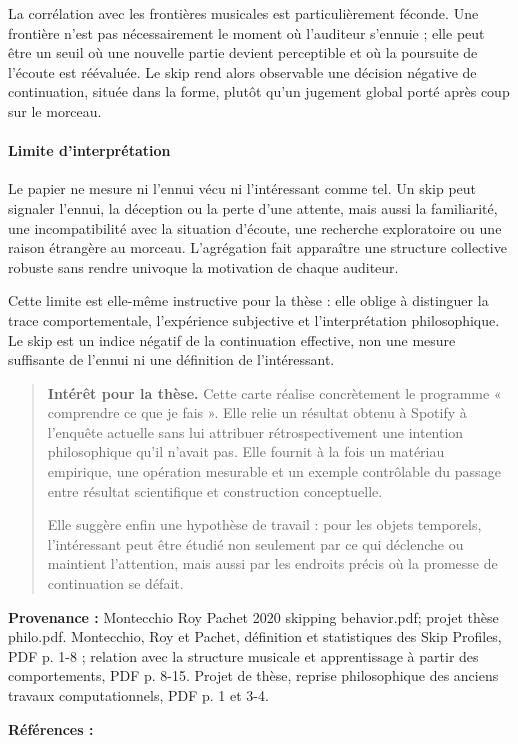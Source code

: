 \documentclass[10pt,a4paper]{article}
\begin{document}
La corrélation avec les frontières musicales est particulièrement féconde. Une frontière n'est pas nécessairement le moment où l'auditeur s'ennuie ; elle peut être un seuil où une nouvelle partie devient perceptible et où la poursuite de l'écoute est réévaluée. Le skip rend alors observable une décision négative de continuation, située dans la forme, plutôt qu'un jugement global porté après coup sur le morceau.

\paragraph{Limite d'interprétation}
Le papier ne mesure ni l'ennui vécu ni l'intéressant comme tel. Un skip peut signaler l'ennui, la déception ou la perte d'une attente, mais aussi la familiarité, une incompatibilité avec la situation d'écoute, une recherche exploratoire ou une raison étrangère au morceau. L'agrégation fait apparaître une structure collective robuste sans rendre univoque la motivation de chaque auditeur.

Cette limite est elle-même instructive pour la thèse : elle oblige à distinguer la trace comportementale, l'expérience subjective et l'interprétation philosophique. Le skip est un indice négatif de la continuation effective, non une mesure suffisante de l'ennui ni une définition de l'intéressant.

\begin{quote}
\textbf{Intérêt pour la thèse.} Cette carte réalise concrètement le programme « comprendre ce que je fais ». Elle relie un résultat obtenu à Spotify à l'enquête actuelle sans lui attribuer rétrospectivement une intention philosophique qu'il n'avait pas. Elle fournit à la fois un matériau empirique, une opération mesurable et un exemple contrôlable du passage entre résultat scientifique et construction conceptuelle.

Elle suggère enfin une hypothèse de travail : pour les objets temporels, l'intéressant peut être étudié non seulement par ce qui déclenche ou maintient l'attention, mais aussi par les endroits précis où la promesse de continuation se défait.
\end{quote}
{\footnotesize\color{metadata}\textbf{Provenance :} Montecchio Roy Pachet 2020 skipping behavior.pdf; projet thèse philo.pdf. Montecchio, Roy et Pachet, définition et statistiques des Skip Profiles, PDF p. 1-8 ; relation avec la structure musicale et apprentissage à partir des comportements, PDF p. 8-15. Projet de thèse, reprise philosophique des anciens travaux computationnels, PDF p. 1 et 3-4.\par}
{\footnotesize\color{metadata}\textbf{Références :} \parencite{montecchio2020skipping}\par}
\end{document}

